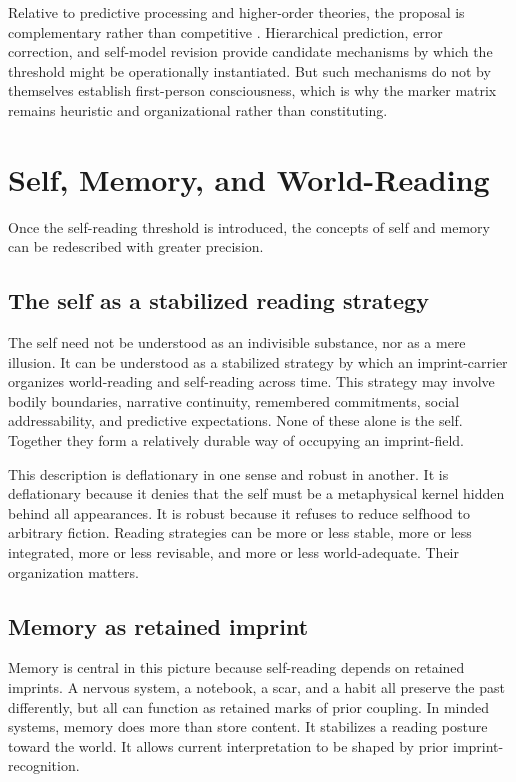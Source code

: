 \documentclass[12pt,a4paper]{article}
\begin{document}
Relative to predictive processing and higher-order theories, the proposal is complementary rather than competitive \cite{Friston2010,Clark2013,Rosenthal2005,LauRosenthal2011}. Hierarchical prediction, error correction, and self-model revision provide candidate mechanisms by which the threshold might be operationally instantiated. But such mechanisms do not by themselves establish first-person consciousness, which is why the marker matrix remains heuristic and organizational rather than constituting.

\section{Self, Memory, and World-Reading}

Once the self-reading threshold is introduced, the concepts of self and memory can be redescribed with greater precision.

\subsection{The self as a stabilized reading strategy}

The self need not be understood as an indivisible substance, nor as a mere illusion. It can be understood as a stabilized strategy by which an imprint-carrier organizes world-reading and self-reading across time. This strategy may involve bodily boundaries, narrative continuity, remembered commitments, social addressability, and predictive expectations. None of these alone is the self. Together they form a relatively durable way of occupying an imprint-field.

This description is deflationary in one sense and robust in another. It is deflationary because it denies that the self must be a metaphysical kernel hidden behind all appearances. It is robust because it refuses to reduce selfhood to arbitrary fiction. Reading strategies can be more or less stable, more or less integrated, more or less revisable, and more or less world-adequate. Their organization matters.

\subsection{Memory as retained imprint}

Memory is central in this picture because self-reading depends on retained imprints. A nervous system, a notebook, a scar, and a habit all preserve the past differently, but all can function as retained marks of prior coupling. In minded systems, memory does more than store content. It stabilizes a reading posture toward the world. It allows current interpretation to be shaped by prior imprint-recognition.
\end{document}
